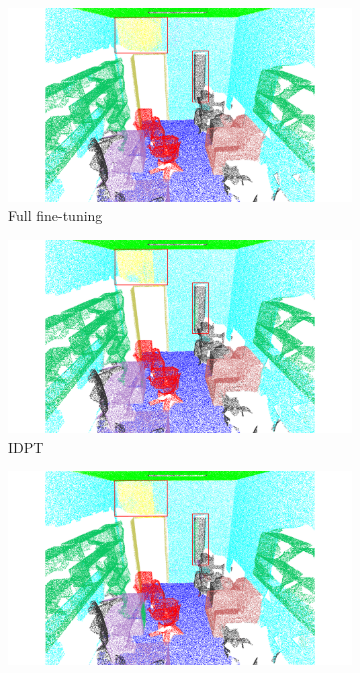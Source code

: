 \begin{figure}
    \centering
    \begin{subfigure}{0.235\textwidth}
        \centering
        \includegraphics[width=\linewidth]{fig/S3DIS/PointMAE.pdf}
        \caption{Full fine-tuning}
        \label{fig:s3dis1}
    \end{subfigure}
    \hfill
    \begin{subfigure}{0.235\textwidth}
        \centering
        \includegraphics[width=\linewidth]{fig/S3DIS/DAPT.pdf}
        \caption{IDPT}
        \label{fig:s3dis2}
    \end{subfigure}
    \hfill
    \begin{subfigure}{0.235\textwidth}
        \centering
        \includegraphics[width=\linewidth]{fig/S3DIS/IDPT.pdf}

\end{subfigure}
\end{figure}
